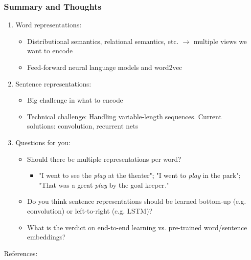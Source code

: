 \documentclass{beamer}
\newcommand{\bi}{\begin{itemize}}
\newcommand{\ei}{\end{itemize}}
\newcommand{\be}{\begin{enumerate}}
\newcommand{\ee}{\end{enumerate}}
\begin{document}
\begin{frame}
\frametitle{Summary and Thoughts}
\be
\item Word representations: 
	\bi
	\item Distributional semantics, relational semantics, etc. $\rightarrow$ multiple views we want to encode
	\item Feed-forward neural language models and word2vec
	\ei
	\pause
\item Sentence representations:
	\bi
	\item Big challenge in what to encode
	\item Technical challenge: Handling variable-length sequences. Current solutions: convolution, recurrent nets 
	\ei 
	\pause
\item Questions for you:
\bi
	\item Should there be multiple representations per word? 
		\bi
		\item "I went to see the {\em play} at the theater"; "I went to {\em play} in the park"; "That was a great {\em play} by the goal keeper."
		\ei
	\pause
	\item Do you think sentence representations should be learned bottom-up (e.g. convolution) or left-to-right (e.g. LSTM)?
	\pause
	\item What is the verdict on end-to-end learning vs. pre-trained word/sentence embeddings?
\ei
\ee
\end{frame}




\begin{frame}[allowframebreaks]
\begin{tiny}
References:


\end{tiny}
\end{frame}
\end{document}
